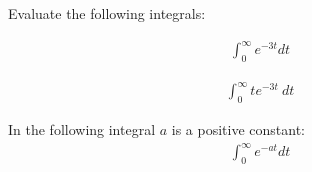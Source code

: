 

\begin{problem}
\item Evaluate the following integrals:

  \begin{subproblem}
  \item 
    \begin{eqnarray*}
      \int^\infty_0 e^{-3t} dt 
    \end{eqnarray*}
    \vfill

  \item 
    \begin{eqnarray*}
      \int^\infty_0 t e^{-3t} ~ dt
    \end{eqnarray*}
    \vfill
      
  \item In the following integral $a$ is a positive constant:
    \begin{eqnarray*}
      \int^\infty_0 e^{-at} dt 
    \end{eqnarray*}
    \vfill

  \end{subproblem}
\end{problem}

